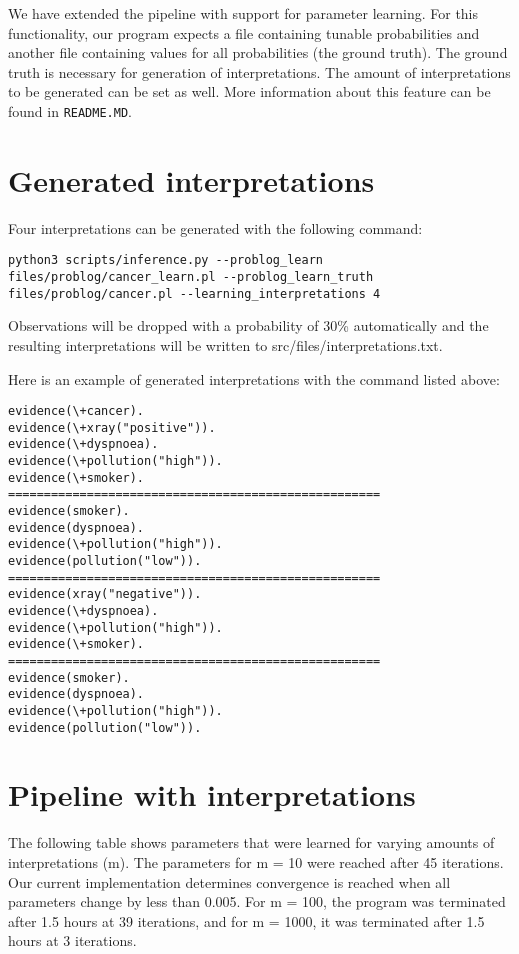We have extended the pipeline with support for parameter learning. For this functionality, our program expects a file containing tunable probabilities and another file containing values for all probabilities (the ground truth). The ground truth is necessary for generation of interpretations. The amount of interpretations to be generated can be set as well. More information about this feature can be found in \texttt{README.MD}.

\section{Generated interpretations}
Four interpretations can be generated with the following command:
\begin{lstlisting}
python3 scripts/inference.py --problog_learn files/problog/cancer_learn.pl --problog_learn_truth files/problog/cancer.pl --learning_interpretations 4
\end{lstlisting}
Observations will be dropped with a probability of 30\% automatically and the resulting interpretations will be written to src/files/interpretations.txt.

Here is an example of generated interpretations with the command listed above:
\begin{lstlisting}
evidence(\+cancer).
evidence(\+xray("positive")).
evidence(\+dyspnoea).
evidence(\+pollution("high")).
evidence(\+smoker).
====================================================
evidence(smoker).
evidence(dyspnoea).
evidence(\+pollution("high")).
evidence(pollution("low")).
====================================================
evidence(xray("negative")).
evidence(\+dyspnoea).
evidence(\+pollution("high")).
evidence(\+smoker).
====================================================
evidence(smoker).
evidence(dyspnoea).
evidence(\+pollution("high")).
evidence(pollution("low")).
\end{lstlisting}

\section{Pipeline with interpretations}
The following table shows parameters that were learned for varying amounts of interpretations (m). The parameters for m = 10 were reached after 45 iterations. Our current implementation determines convergence is reached when all parameters change by less than 0.005. For m = 100, the program was terminated after 1.5 hours at 39 iterations, and for m = 1000, it was terminated after 1.5 hours at 3 iterations.


